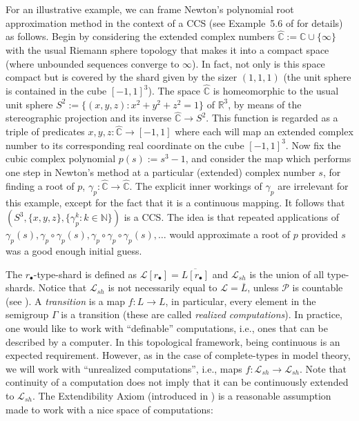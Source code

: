 \documentclass[psamsfonts]{amsart}
\theoremstyle{definition}
\theoremstyle{remark}
\numberwithin{equation}{section}
\begin{document}
For an illustrative example, we can frame Newton's polynomial root approximation method in the context of a CCS (see Example~5.6 of \cite{alva2024approximability} for details) as follows. Begin by considering the extended complex numbers $\hat{\mathbb{C}}:=\mathbb{C}\cup\{\infty\}$ with the usual Riemann sphere topology that makes it into a compact space (where unbounded sequences converge to $\infty$). In fact, not only is this space compact but is covered by the shard given by the sizer $(1,1,1)$ (the unit sphere is contained in the cube $[-1,1]^3$). The space $\hat{\mathbb{C}}$ is homeomorphic to the usual unit sphere $S^2:=\{(x,y,z):x^2+y^2+z^2=1\}$ of $\mathbb R^3$, by means of the stereographic projection and its inverse $\hat{\mathbb{C}}\to S^2$. This function is regarded as a triple of predicates $x,y,z:\hat{\mathbb{C}}\to[-1,1]$ where each will map an extended complex number to its corresponding real coordinate on the cube $[-1,1]^3$. Now fix the cubic complex polynomial $p(s):=s^3-1$, and consider the map which performs one step in Newton's method at a particular (extended) complex number $s$, for finding a root of $p$, $\gamma_p:\hat{\mathbb{C}}\to\hat{\mathbb{C}}$. The explicit inner workings of $\gamma_p$ are irrelevant for this example, except for the fact that it is a continuous mapping. It follows that $(S^3,\{x,y,z\},\{\gamma_p^k:k\in\mathbb N\})$ is a CCS. The idea is that repeated applications of $\gamma_p(s), \gamma_p\circ\gamma_p(s), \gamma_p\circ\gamma_p\circ\gamma_p(s),\dots$ would approximate a root of $p$ provided $s$ was a good enough initial guess.

The $r_{\bullet}$-type-shard is defined as $\mathcal{L}[r_\bullet]=\overline{L[r_\bullet]}$ and $\mathcal{L}_{sh}$ is the union of all type-shards. Notice that $\mathcal{L}_{sh}$ is not necessarily equal to $\mathcal{L}=\overline{L}$, unless $\mathcal{P}$ is countable (see \cite{alva2024approximability}). A \emph{transition} is a map $f:L\rightarrow L$, in particular, every element in the semigroup $\Gamma$ is a transition (these are called \emph{realized computations}). In practice, one would like to work with ``definable'' computations, i.e., ones that can be described by a computer. In this topological framework, being continuous is an expected requirement. However, as in the case of complete-types in model theory, we will work with ``unrealized computations'', i.e., maps $f:\mathcal{L}_{sh}\rightarrow\mathcal{L}_{sh}$. Note that continuity of a computation does not imply that it can be continuously extended to $\mathcal{L}_{sh}$. The Extendibility Axiom (introduced in \cite{alva2024approximability}) is a reasonable assumption made to work with a nice space of computations:
\end{document}
